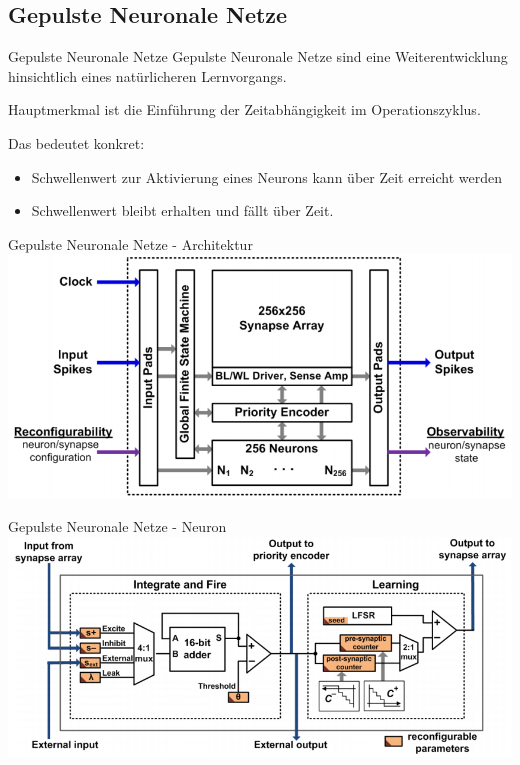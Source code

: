 \subsection{Gepulste Neuronale Netze}

\begin{slide}{Gepulste Neuronale Netze}
	Gepulste Neuronale Netze sind eine Weiterentwicklung hinsichtlich eines natürlicheren Lernvorgangs.
	
	Hauptmerkmal ist die \alert{Einführung der Zeitabhängigkeit} im Operationszyklus.

	Das bedeutet konkret:
	\begin{itemize}
		\item Schwellenwert zur Aktivierung eines Neurons kann über Zeit erreicht werden
		\item Schwellenwert bleibt erhalten und fällt über Zeit.
	\end{itemize}
\end{slide}

\begin{slide}{Gepulste Neuronale Netze - Architektur}
	\includegraphics[width=\textwidth,height=0.8\textheight,keepaspectratio]{content/Spiking1.PNG}
\end{slide}

\begin{slide}{Gepulste Neuronale Netze - Neuron}
	\includegraphics[width=\textwidth,height=0.8\textheight,keepaspectratio]{content/Spiking2.PNG}
\end{slide}

